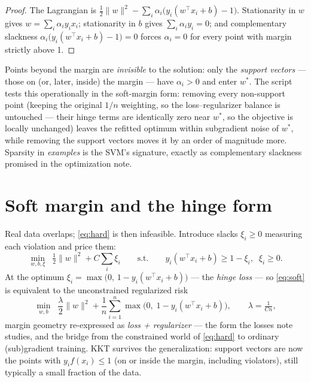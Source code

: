 \documentclass[11pt]{article}
\begin{document}
\begin{proof}
The Lagrangian is $\tfrac12\lVert w\rVert^2 - \sum_i \alpha_i
\bigl(y_i(w^\top x_i + b) - 1\bigr)$. Stationarity in $w$ gives
$w = \sum_i \alpha_i y_i x_i$; stationarity in $b$ gives
$\sum_i \alpha_i y_i = 0$; and complementary slackness
$\alpha_i\bigl(y_i(w^\top x_i + b) - 1\bigr) = 0$ forces $\alpha_i = 0$
for every point with margin strictly above 1.
\end{proof}

Points beyond the margin are \emph{invisible} to the solution: only the
\emph{support vectors} --- those on (or, later, inside) the margin ---
have $\alpha_i > 0$ and enter $w^\ast$. The script tests this
operationally in the soft-margin form: removing every non-support point
(keeping the original $1/n$ weighting, so the loss--regularizer balance
is untouched --- their hinge terms are identically zero near $w^\ast$, so
the objective is locally unchanged) leaves the refitted optimum within
subgradient noise of $w^\ast$, while removing the support vectors moves
it by an order of magnitude more. Sparsity in \emph{examples} is the
SVM's signature, exactly as complementary slackness promised in the
optimization note.

\section{Soft margin and the hinge form}

Real data overlaps; \eqref{eq:hard} is then infeasible. Introduce slacks
$\xi_i \ge 0$ measuring each violation and price them:
\begin{equation}
  \min_{w,b,\xi}\;\; \tfrac12\lVert w\rVert^2 + C\sum_i \xi_i
  \qquad\text{s.t.}\qquad
  y_i(w^\top x_i + b) \ge 1 - \xi_i,\;\; \xi_i \ge 0 .
  \label{eq:soft}
\end{equation}
At the optimum $\xi_i = \max\bigl(0,\, 1 - y_i(w^\top x_i + b)\bigr)$
--- the \emph{hinge loss} --- so \eqref{eq:soft} is equivalent to the
unconstrained regularized risk
\begin{equation}
  \min_{w,b}\;\;
  \frac{\lambda}{2}\lVert w\rVert^2
  + \frac1n\sum_{i=1}^n \max\bigl(0,\; 1 - y_i(w^\top x_i + b)\bigr),
  \qquad \lambda = \tfrac{1}{Cn},
  \label{eq:hinge}
\end{equation}
margin geometry re-expressed as \emph{loss + regularizer} --- the form
the losses note studies, and the bridge from the constrained world of
\eqref{eq:hard} to ordinary (sub)gradient training. KKT survives the
generalization: support vectors are now the points with
$y_i f(x_i) \le 1$ (on or inside the margin, including violators), still
typically a small fraction of the data.
\end{document}
